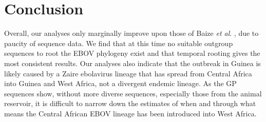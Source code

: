 \documentclass[11pt,oneside,letterpaper]{article}
\begin{document}
\section*{Conclusion}
Overall, our analyses only marginally improve upon those of Baize \textit{et al}. \cite{baize2014}, due to paucity of sequence data. 
We find that at this time no suitable outgroup sequences to root the EBOV phylogeny exist and that temporal rooting gives the most consistent results.
Our analyses also indicate that the outbreak in Guinea is likely caused by a Zaire ebolavirus lineage that has spread from Central Africa into Guinea and West Africa, not a divergent endemic lineage.
As the GP sequences show, without more diverse sequences, especially those from the animal reservoir, it is difficult to narrow down the estimates of when and through what means the Central African EBOV lineage has been introduced into West Africa.




\end{document}
